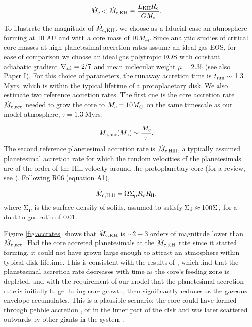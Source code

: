 \documentclass[apj]{emulateapj}
\newcommand{\delad}{\nabla_{\rm ad}}
\newcommand{\co}{_{\rm c}}
\newcommand{\di}{_{\rm d}}
\begin{document}
\begin{equation}
\label{eq:McdotKH}
\dot{M\co}<\dot{M}_{\rm c, KH} \equiv \frac{L_{\rm KH} R\co}{G M\co}.
\end{equation} 
To illustrate the magnitude of $\dot{M}_{\rm c, KH}$, we choose as a fiducial case an atmosphere forming at 10 AU and with a core mass of $10 M_{\oplus}$. Since analytic studies of critical core masses at high planetesimal accretion rates assume an ideal gas EOS, for ease of comparison we choose an ideal gas polytropic EOS with constant adiabatic gradient $\delad=2/7$ and mean molecular weight $\mu=2.35$ (see also Paper I). For this choice of parameters, the runaway accretion time is $t _{\rm run}\sim$ 1.3 Myrs, which is within the typical lifetime of a protoplanetary disk. We also estimate two reference accretion rates. The first one is the core accretion rate $\dot{M}_{\rm c, acc}$ needed to grow the core to $M\co=10 M_{\oplus}$ on the same timescale as our model atmosphere, $\tau=1.3$ Myrs:

\begin{equation}
\label{eq:Mcdot}
\dot{M}_{\rm{c,acc}}(M_{\rm{c}}) \sim \frac{M_{\rm{c}}}{\tau}.
\end{equation}
The second reference planetesimal accretion rate is $\dot{M}_{\rm c, Hill}$, a typically assumed planetesimal accretion rate for which the random velocities of the planetesimals are of the order of the Hill velocity around the protoplanetary core (for a review, see \citealt{goldreich04}). Following R06 (equation A1),


\begin{equation}
\label{eq:MdotHill}
\dot{M}_{\rm{c,Hill}}=\Omega \Sigma_{\rm p} R\co R_{\rm H},
\end{equation}
where $\Sigma_{\rm p}$ is the surface density of solids, assumed to satisfy $\Sigma\di \approx 100 \Sigma_{\rm p}$ for a dust-to-gas ratio of 0.01.

Figure \ref{fig:accrates} shows that $\dot{M}_{\rm c,KH}$ is $\sim2-3$ orders of magnitude lower than $\dot{M}_{\rm c, acc}$. Had the core accreted planetesimals at the $\dot{M}_{\rm c, KH}$ rate since it started forming, it could not have grown large enough to attract an atmosphere within typical disk lifetime. This is consistent with the results of \citet{pollack96}, which find that the planetesimal accretion rate decreases with time as the core's feeding zone is depleted, and with the requirement of our model that the planetesimal accretion rate is initially large during core growth, then significantly reduces as the gaseous envelope accumulates. This is a plausible scenario: the core could have formed through pebble accretion \citep{lambrechts12}, or in the inner part of the disk and was later scattered outwards by other giants in the system \citep{ida13}. 
\end{document}
